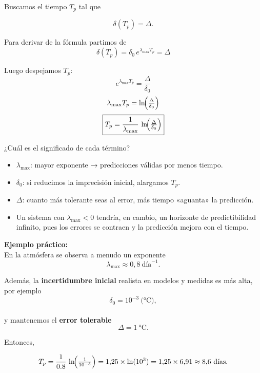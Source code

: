 \documentclass[
  10pt,
  a4paper,
  DIV=11,
  numbers=noendperiod,
  open=any]{scrreprt}
\providecommand{\tightlist}{%
  \setlength{\itemsep}{0pt}\setlength{\parskip}{0pt}}
\numberwithin{equation}{chapter}
\numberwithin{equation}{chapter}
\renewcommand{\[}{\begin{equation}}
\renewcommand{\]}{\end{equation}}
\begin{document}
Buscamos el tiempo \(T_p\) tal que

\begin{equation}

\delta(T_p) = \Delta.

\end{equation}

Para derivar de la fórmula partimos de\\
\[
   \delta(T_p) = \delta_0\,e^{\lambda_{\max}T_p} = \Delta
   \]

Luego despejamos \(T_p\):\\
\[
   e^{\lambda_{\max}T_p} = \frac{\Delta}{\delta_0}
   \] \[
   \lambda_{\max}T_p = \ln\!\Bigl(\tfrac{\Delta}{\delta_0}\Bigr)
   \] \[
   \boxed{T_p = \frac{1}{\lambda_{\max}}\,\ln\!\Bigl(\tfrac{\Delta}{\delta_0}\Bigr)}
   \]

¿Cuál es el significado de cada término?

\begin{itemize}
\tightlist
\item
  \textbf{\(\lambda_{\max}\)}: mayor exponente → predicciones válidas
  por menos tiempo.\\
\item
  \textbf{\(\delta_0\)}: si reducimos la imprecisión inicial, alargamos
  \(T_p\).\\
\item
  \textbf{\(\Delta\)}: cuanto más tolerante seas al error, más tiempo
  «aguanta» la predicción.
\item
  Un sistema con \(\lambda_{\max}<0\) tendría, en cambio, un horizonte
  de predictibilidad infinito, pues los errores se contraen y la
  predicción mejora con el tiempo.
\end{itemize}

\textbf{Ejemplo práctico:}\\
En la atmósfera se observa a menudo un exponente\\
\[
\lambda_{\max} \approx 0{,}8\ \text{día}^{-1}.
\]

Además, la \textbf{incertidumbre inicial} realista en modelos y medidas
es más alta, por ejemplo\\
\[
\delta_0 = 10^{-3}\ \text{(°C)},
\]\\
y mantenemos el \textbf{error tolerable}\\
\[
\Delta = 1\ \text{°C}.
\]

Entonces,

\begin{equation}

T_p
= \frac{1}{0.8}\,\ln\!\Bigl(\tfrac{1}{10^{-3}}\Bigr)
=1{,}25 \times \ln(10^3)
=1{,}25 \times 6{,}91
\approx 8{,}6\ \text{días}.

\end{equation}
\end{document}
